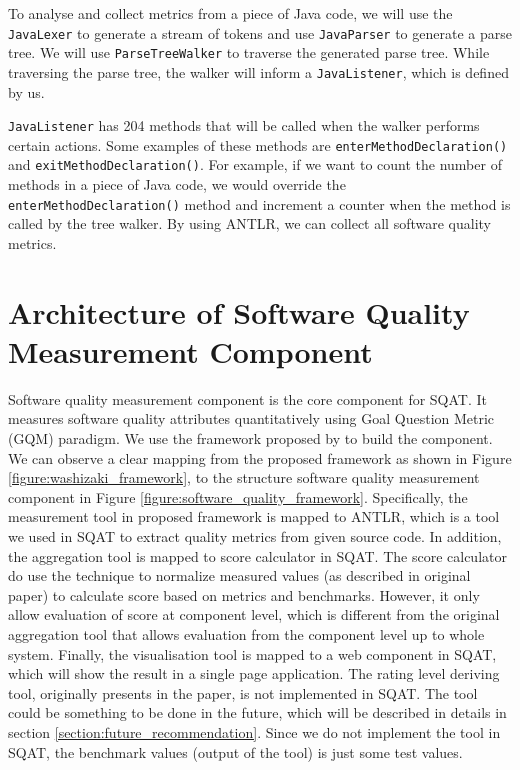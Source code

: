 To analyse and collect metrics from a piece of Java code, we will use the \verb|JavaLexer| to generate a stream of tokens and use \verb|JavaParser| to generate a parse tree. We will use \verb|ParseTreeWalker| to traverse the generated parse tree. While traversing the parse tree, the walker will inform a \verb|JavaListener|, which is defined by us. 

\verb|JavaListener| has 204 methods that will be called when the walker performs certain actions. Some examples of these methods are \verb|enterMethodDeclaration()| and \verb|exitMethodDeclaration()|. For example, if we want to count the number of methods in a piece of Java code, we would override the \verb|enterMethodDeclaration()| method and increment a counter when the method is called by the tree walker. By using ANTLR, we can collect all software quality metrics. 

\section{Architecture of Software Quality Measurement Component} \label{section:architecture_of_sqat_core}

Software quality measurement component is the core component for SQAT. It measures software quality attributes quantitatively using Goal Question Metric (GQM) paradigm. We use the framework proposed by \cite{washizaki2007framework} to build the component. We can observe a clear mapping from the proposed framework as shown in Figure \ref{figure:washizaki_framework}, to the structure software quality measurement component in Figure  \ref{figure:software_quality_framework}. Specifically, the measurement tool in proposed framework is mapped to ANTLR, which is a tool we used in SQAT to extract quality metrics from given source code. In addition, the aggregation tool is mapped to score calculator in SQAT. The score calculator do use the technique to normalize measured values (as described in original paper) to calculate score based on metrics and benchmarks. However, it only allow evaluation of score at component level, which is different from the original aggregation tool that allows evaluation from the component level up to whole system. Finally, the visualisation tool is mapped to a web component in SQAT, which will show the result in a single page application. The rating level deriving tool, originally presents in the \cite{washizaki2007framework} paper, is not implemented in SQAT. The tool could be something to be done in the future, which will be described in details in section \ref{section:future_recommendation}. Since we do not implement the tool in SQAT, the benchmark values (output of the tool) is just some test values.

